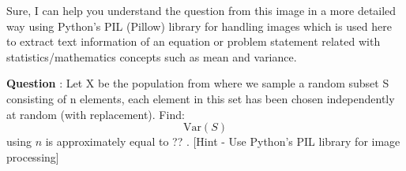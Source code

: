 Sure, I can help you understand the question from this image in a more detailed way using Python's PIL (Pillow) library for handling images which is used here to extract text information of an equation or problem statement related with statistics/mathematics concepts such as mean and variance. 

\textbf{Question} : Let X be the population from where we sample a random subset S consisting of n elements, each element in this set has been chosen independently at random (with replacement). Find:  $$ \text{Var}(S) $$ using $n$ is approximately equal to ?? .  [Hint - Use Python's PIL library for image processing]
